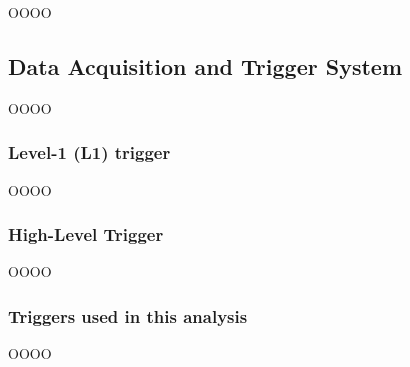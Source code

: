 OOOO

\subsection{Data Acquisition and Trigger System}
\label{heading:Chapters-CH4-10}

OOOO

\subsubsection*{Level-1 (L1) trigger}

OOOO

\subsubsection*{High-Level Trigger}

OOOO

\subsubsection*{Triggers used in this analysis}

OOOO

